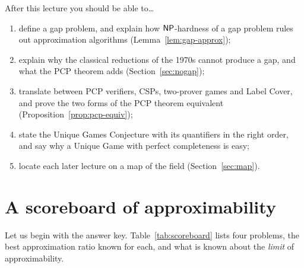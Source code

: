 \begin{goalbox}{After this lecture you should be able to\ldots}
\begin{enumerate}[leftmargin=*,label=(\arabic*)]
  \item define a gap problem, and explain how $\mathsf{NP}$-hardness of a gap problem rules out
        approximation algorithms (Lemma~\ref{lem:gap-approx});
  \item explain why the classical reductions of the 1970s cannot produce a gap, and what the
        PCP theorem adds (Section~\ref{sec:nogap});
  \item translate between PCP verifiers, CSPs, two-prover games and Label Cover, and prove
        the two forms of the PCP theorem equivalent (Proposition~\ref{prop:pcp-equiv});
  \item state the Unique Games Conjecture with its quantifiers in the right order, and say
        why a Unique Game with perfect completeness is easy;
  \item locate each later lecture on a map of the field (Section~\ref{sec:map}).
\end{enumerate}
\end{goalbox}


\section{A scoreboard of approximability}
\label{sec:scoreboard}

Let us begin with the answer key.  Table~\ref{tab:scoreboard} lists four problems, the best
approximation ratio known for each, and what is known about the \emph{limit} of
approximability.

